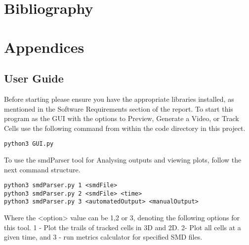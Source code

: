 \documentclass[12pt a4paper]{article}
\begin{document}
\newpage
\section{Bibliography}
\printbibliography
\newpage
\section{Appendices}
\subsection{User Guide}
Before starting please ensure you have the appropriate libraries installed, as mentioned in the Software Requirements section of the report.
To start this program as the GUI with the options to Preview, Generate a Video, or Track Cells use the following command from within the code directory in this project. 

\begin{verbatim}
python3 GUI.py
\end{verbatim}

To use the smdParser tool for Analysing outputs and viewing plots, follow the next command structure.
\begin{verbatim}
python3 smdParser.py 1 <smdFile>
python3 smdParser.py 2 <smdFile> <time>
python3 smdParser.py 3 <automatedOutput> <manualOutput>
\end{verbatim}
Where the <option> value can be 1,2 or 3, denoting the following options for this tool. 1 - Plot the trails of tracked cells in 3D and 2D. 2- Plot all cells at a given time, and 3 - run metrics calculator for specified SMD files.
\end{document}
